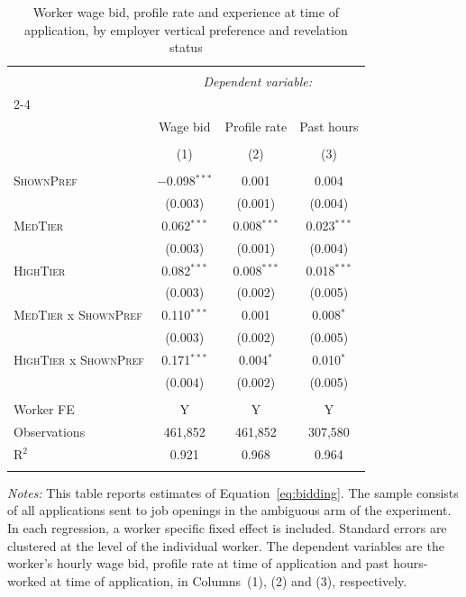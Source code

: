 
\begin{table}[!htbp] \centering 
  \caption{Worker wage bid, profile rate and experience at time of application, by employer vertical preference and revelation status} 
  \label{tab:bidding_effect} 
\small 
\begin{tabular}{@{\extracolsep{5pt}}lccc} 
\\[-1.8ex]\hline 
\hline \\[-1.8ex] 
 & \multicolumn{3}{c}{\textit{Dependent variable:}} \\ 
\cline{2-4} 
\\[-1.8ex] & Wage bid & Profile rate & Past hours \\ 
\\[-1.8ex] & (1) & (2) & (3)\\ 
\hline \\[-1.8ex] 
 \textsc{ShownPref} & $-$0.098$^{***}$ & 0.001 & 0.004 \\ 
  & (0.003) & (0.001) & (0.004) \\ 
  \textsc{MedTier} & 0.062$^{***}$ & 0.008$^{***}$ & 0.023$^{***}$ \\ 
  & (0.003) & (0.001) & (0.004) \\ 
  \textsc{HighTier} & 0.082$^{***}$ & 0.008$^{***}$ & 0.018$^{***}$ \\ 
  & (0.003) & (0.002) & (0.005) \\ 
  \textsc{MedTier} x \textsc{ShownPref} & 0.110$^{***}$ & 0.001 & 0.008$^{*}$ \\ 
  & (0.003) & (0.002) & (0.005) \\ 
  \textsc{HighTier} x \textsc{ShownPref} & 0.171$^{***}$ & 0.004$^{*}$ & 0.010$^{*}$ \\ 
  & (0.004) & (0.002) & (0.005) \\ 
 \hline \\[-1.8ex] 
Worker FE & Y & Y & Y \\ 
Observations & 461,852 & 461,852 & 307,580 \\ 
R$^{2}$ & 0.921 & 0.968 & 0.964 \\ 
\hline 
\hline \\[-1.8ex] 
\end{tabular}
\begin{minipage}{1\textwidth} 
 \emph{Notes:} This table reports estimates of Equation~\ref{eq:bidding}.
The sample consists of all applications sent to job openings in the ambiguous arm of the experiment.
In each regression, a worker specific fixed effect is included.
Standard errors are clustered at the level of the individual worker.
The dependent variables are the worker's hourly wage bid, profile rate at time of application and past hours-worked at time of application, in Columns~(1), (2) and (3), respectively. 
 \starlanguage
 \end{minipage}
\end{table}
